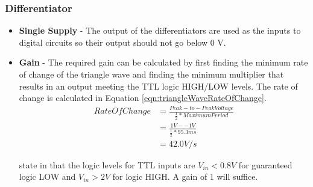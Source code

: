 \subsubsection{Differentiator}
\begin{itemize}
    \item \textbf{Single Supply} - The output of the differentiators are used as the inputs to digital circuits so their output should not go below 0 V.

    \item \textbf{Gain} - The required gain can be calculated by first finding the minimum rate of change of the triangle wave and finding the minimum multiplier that results in an output meeting the TTL logic HIGH/LOW levels.
    The rate of change is calculated in Equation \ref{eqn:triangleWaveRateOfChange}.
    \begin{equation}
        \begin{split}
            Rate Of Change  &= \frac{Peak-to-Peak Voltage}{\frac{1}{2}*Maximum Period}\\
                            &= \frac{1 V - -1V}{\frac{1}{2}*95.3 ms}\\
                            &= 42.0 V/s
        \end{split}
        \label{eqn:triangleWaveRateOfChange}
    \end{equation} 

    \citeauthor{TTLLogicLevels} state in  that the logic levels for TTL inputs are $V_{in} < 0.8 V$ for guaranteed logic LOW and $V_{in} > 2 V$ for logic HIGH.
    A gain of 1 will suffice.

\end{itemize}
